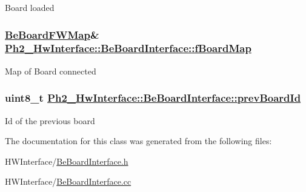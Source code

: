Board loaded \hypertarget{class_ph2___hw_interface_1_1_be_board_interface_ff153bb1272b1f145c919a9ba2cc572d}{
\subsubsection[fBoardMap]{\setlength{\rightskip}{0pt plus 5cm}\hyperlink{namespace_ph2___hw_interface_59fe3165f25ded62b5b12cf0ebc69e8d}{Be\-Board\-FWMap}\& \hyperlink{class_ph2___hw_interface_1_1_be_board_interface_ff153bb1272b1f145c919a9ba2cc572d}{Ph2\_\-Hw\-Interface::Be\-Board\-Interface::f\-Board\-Map}}}
\label{class_ph2___hw_interface_1_1_be_board_interface_ff153bb1272b1f145c919a9ba2cc572d}


Map of Board connected \hypertarget{class_ph2___hw_interface_1_1_be_board_interface_f248fa0474f163d72349854f12d3ad61}{
\subsubsection[prevBoardId]{\setlength{\rightskip}{0pt plus 5cm}uint8\_\-t \hyperlink{class_ph2___hw_interface_1_1_be_board_interface_f248fa0474f163d72349854f12d3ad61}{Ph2\_\-Hw\-Interface::Be\-Board\-Interface::prev\-Board\-Id}}}
\label{class_ph2___hw_interface_1_1_be_board_interface_f248fa0474f163d72349854f12d3ad61}


Id of the previous board 

The documentation for this class was generated from the following files:\begin{CompactItemize}
\item 
HWInterface/\hyperlink{_be_board_interface_8h}{Be\-Board\-Interface.h}\item 
HWInterface/\hyperlink{_be_board_interface_8cc}{Be\-Board\-Interface.cc}\end{CompactItemize}
